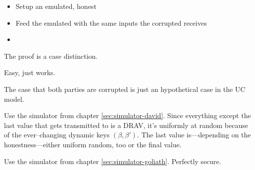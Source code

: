 \label{sec:simulator-goliath}

\begin{itemize}

  \item Setup an emulated, honest \JWpOne{}

  \item Feed the emulated \JWpOne{} with the same inputs the corrupted \JWpOne{}
    receives

  \item

\end{itemize}


%
%
\label{sec:proof}

The proof is a case distinction.



Easy, just works.




The case that both parties are corrupted is just an hypothetical case in the UC
model.



Use the simulator from chapter \ref{sec:simulator-david}. Since everything
except the last value that gets transmitted to \JWpTwo{} is a DRAV, it's
uniformly at random because of the ever--changing dynamic keys $(\beta,
\beta')$. The last value is---depending on the honestness---either uniform
random, too or the final value.



Use the simulator from chapter \ref{sec:simulator-goliath}. Perfectly secure.

